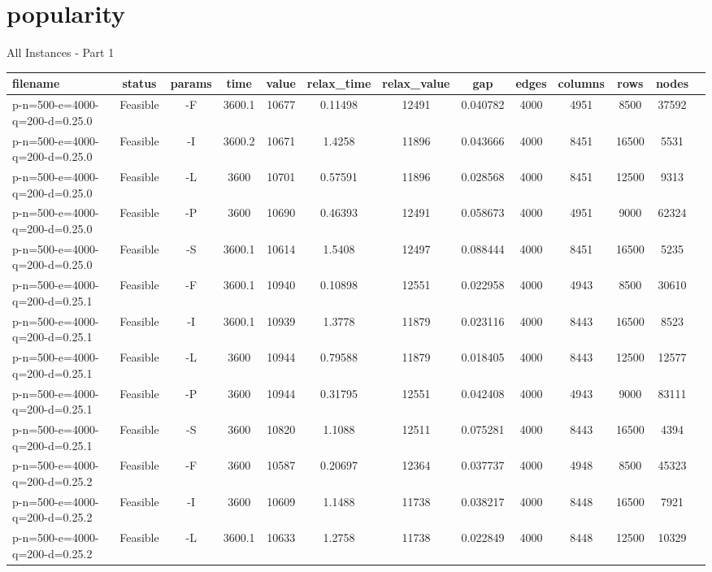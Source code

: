 \documentclass[landscape, a4paper]{article}
\begin{document}
\section{popularity}
\begin{center}
All Instances - Part 1

\begin{tabular}{lcccccccccccc}
filename & status & params & time & value & relax\_time & relax\_value & gap & edges & columns & rows & nodes & \\
\hline
p-n=500-e=4000-q=200-d=0.25.0 & Feasible & -F & 3600.1 & 10677 & 0.11498 & 12491 & 0.040782 & 4000 & 4951 & 8500 & 37592 & \\
p-n=500-e=4000-q=200-d=0.25.0 & Feasible & -I & 3600.2 & 10671 & 1.4258 & 11896 & 0.043666 & 4000 & 8451 & 16500 & 5531 & \\
p-n=500-e=4000-q=200-d=0.25.0 & Feasible & -L & 3600 & 10701 & 0.57591 & 11896 & 0.028568 & 4000 & 8451 & 12500 & 9313 & \\
p-n=500-e=4000-q=200-d=0.25.0 & Feasible & -P & 3600 & 10690 & 0.46393 & 12491 & 0.058673 & 4000 & 4951 & 9000 & 62324 & \\
p-n=500-e=4000-q=200-d=0.25.0 & Feasible & -S & 3600.1 & 10614 & 1.5408 & 12497 & 0.088444 & 4000 & 8451 & 16500 & 5235 & \\
p-n=500-e=4000-q=200-d=0.25.1 & Feasible & -F & 3600.1 & 10940 & 0.10898 & 12551 & 0.022958 & 4000 & 4943 & 8500 & 30610 & \\
p-n=500-e=4000-q=200-d=0.25.1 & Feasible & -I & 3600.1 & 10939 & 1.3778 & 11879 & 0.023116 & 4000 & 8443 & 16500 & 8523 & \\
p-n=500-e=4000-q=200-d=0.25.1 & Feasible & -L & 3600 & 10944 & 0.79588 & 11879 & 0.018405 & 4000 & 8443 & 12500 & 12577 & \\
p-n=500-e=4000-q=200-d=0.25.1 & Feasible & -P & 3600 & 10944 & 0.31795 & 12551 & 0.042408 & 4000 & 4943 & 9000 & 83111 & \\
p-n=500-e=4000-q=200-d=0.25.1 & Feasible & -S & 3600 & 10820 & 1.1088 & 12511 & 0.075281 & 4000 & 8443 & 16500 & 4394 & \\
p-n=500-e=4000-q=200-d=0.25.2 & Feasible & -F & 3600 & 10587 & 0.20697 & 12364 & 0.037737 & 4000 & 4948 & 8500 & 45323 & \\
p-n=500-e=4000-q=200-d=0.25.2 & Feasible & -I & 3600 & 10609 & 1.1488 & 11738 & 0.038217 & 4000 & 8448 & 16500 & 7921 & \\
p-n=500-e=4000-q=200-d=0.25.2 & Feasible & -L & 3600.1 & 10633 & 1.2758 & 11738 & 0.022849 & 4000 & 8448 & 12500 & 10329 & \\

\end{tabular}
\end{center}
\end{document}
